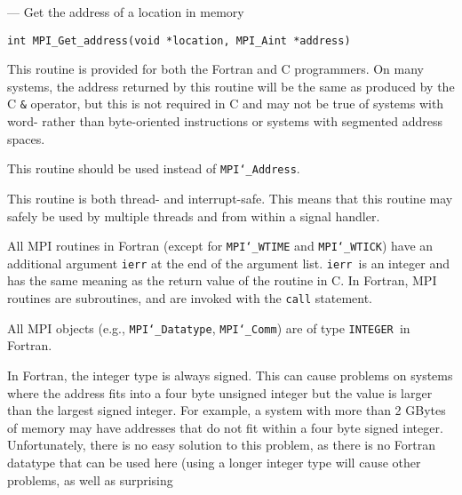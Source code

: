 \startmanpage
{}
--- Get the address of a location in memory  
\startvb\begin{verbatim}
int MPI_Get_address(void *location, MPI_Aint *address)

\end{verbatim}
\endvb

\par
{}
\par
{}
This routine is provided for both the Fortran and C programmers.
On many systems, the address returned by this routine will be the same
as produced by the C {\tt \&} operator, but this is not required in C and
may not be true of systems with word- rather than byte-oriented
instructions or systems with segmented address spaces.
\par
This routine should be used instead of {\tt MPI{\tt \char`\_}Address}.
\par
{}
\par
This routine is both thread- and interrupt-safe.
This means that this routine may safely be used by multiple threads and
from within a signal handler.
\par
{}
All MPI routines in Fortran (except for {\tt MPI{\tt \char`\_}WTIME} and {\tt MPI{\tt \char`\_}WTICK}) have
an additional argument {\tt ierr} at the end of the argument list.  {\tt ierr
}is an integer and has the same meaning as the return value of the routine
in C.  In Fortran, MPI routines are subroutines, and are invoked with the
{\tt call} statement.
\par
All MPI objects (e.g., {\tt MPI{\tt \char`\_}Datatype}, {\tt MPI{\tt \char`\_}Comm}) are of type {\tt INTEGER
}in Fortran.
\par
In Fortran, the integer type is always signed.  This can cause problems
on systems where the address fits into a four byte unsigned integer but
the value is larger than the largest signed integer.  For example, a system
with more than 2 GBytes of memory may have addresses that do not fit within
a four byte signed integer.  Unfortunately, there is no easy solution to
this problem, as there is no Fortran datatype that can be used here (using
a longer integer type will cause other problems, as well as surprising
